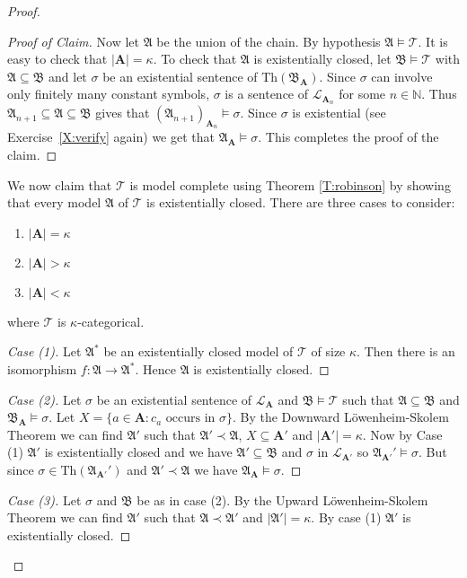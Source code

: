 \documentclass[titlepage, oneside]{amsbook}
\theoremstyle{plain}
\theoremstyle{definition}
\theoremstyle{remark}
\newcommand{\amt}{\ensuremath{\mathfrak A \models \mathcal T }}
\newcommand{\bmt}{\ensuremath{\mathfrak B \models \mathcal T }}
\newcommand{\Th}{\ensuremath{\mbox{Th}}}
\newcommand{\theory}{\ensuremath{\mathcal{T}}}
\newcommand{\lan}{\ensuremath{\mathcal{L}}}
\newcommand{\seq}{\ensuremath{\subseteq}}
\newcommand{\ma}{\ensuremath{\mathfrak{A}}}
\newcommand{\mb}{\ensuremath{\mathfrak{B}}}
\newcommand{\masb}{\ensuremath{\mathfrak{A} \subseteq \mathfrak{B}}}
\newcommand{\ba}{\ensuremath{\mathbf{A}}}
\newcommand{\nat}{\ensuremath{\mathbb{N}}}
\begin{document}
\begin{proof}
\begin{proof}[Proof of Claim]
Now let $\ma$ be the union of the chain. By hypothesis $\amt$.  It is
easy to check that
$|\ba| = \kappa$.  To check that $\ma$ is existentially closed, let
$\bmt$ with $\masb$ and let $\sigma$ be an existential sentence of 
$\Th(\mb_\ba)$.  Since $\sigma$ can involve only finitely
many constant symbols, $\sigma$ is a sentence of $\lan_{\ba_n}$ for
some $n \in \nat$.  Thus $\ma_{n+1} \seq \ma \seq \mb$ gives that
$(\ma_{n+1})_{\ba_n}
\models \sigma$.  Since $\sigma$ is existential (see
Exercise~\ref{X:verify} again) we get that $\ma_{\ba} \models \sigma$.  This
completes the proof of the claim.
\renewcommand{\qedsymbol}{}
\end{proof}

We now claim that $\theory$ is model complete using Theorem
\ref{T:robinson}  by showing that every model 
$\ma$ of $\theory$ is existentially closed. There are three cases to 
consider:
\begin{enumerate}
\item $|\mathbf A | = \kappa $
\item $|\mathbf A | > \kappa $
\item $|\mathbf A | < \kappa $
\end{enumerate}
where $\theory$ is $\kappa$-categorical.

\begin{proof}[Case (1)] 
Let $\ma^{\ast}$ be an existentially  closed model of $\theory$ of size 
$\kappa$. Then there is an isomorphism $f: \ma \to \ma^{\ast}$. Hence
$\ma$ is existentially closed.
\renewcommand{\qedsymbol}{}
\end{proof}

\begin{proof}[Case (2)] Let $\sigma$ be an existential sentence of
$\lan_\ba$ and $\mb \models \theory$ such that $\ma \seq \mb$ and $\mb_\ba
\models \sigma$.
Let $X= \{ a \in \mathbf A : c_a \mbox{ occurs  in } \sigma \} $.
By the Downward L\"{o}wenheim-Skolem Theorem we can find $\ma'$ 
such that $\ma' \prec \ma $, $ X \subseteq \mathbf{A}'$ and 
$|\mathbf{A}'|=\kappa$.
Now by Case (1) $\ma'$ is existentially closed and we have $\ma' 
\subseteq \mb$ and $\sigma$ in $\lan_{\ba'}$ so $\ma_{\ba'}' \models
\sigma $.
But since $\sigma \in  \mbox{Th}(\ma_{\ba'}') $ and $\ma' \prec \ma $ we 
have $\ma_\ba \models \sigma $.
\renewcommand{\qedsymbol}{}
\end{proof}

\begin{proof}[Case (3)] Let $\sigma$ and $\mb$ be as in case (2).
By the Upward L\"{o}wenheim-Skolem Theorem we can find $\ma'$
such 
that $\ma \prec \ma'$ and $|\ma'| = \kappa $.
By case (1) $\ma'$ is existentially  closed.
\renewcommand{\qedsymbol}{}
\end{proof}


\end{proof}
\end{document}
